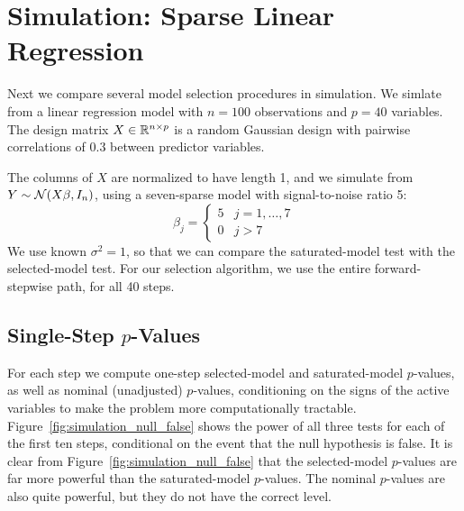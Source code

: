 \documentclass{article}
\begin{document}
\section{Simulation: Sparse Linear Regression}\label{sec:sparseReg}

Next we compare several model selection procedures in simulation. We simlate from a linear regression model with $n=100$ observations and $p=40$ variables. The design matrix $X\in\mathbb{R}^{n\times p}$ is a random Gaussian design with pairwise correlations of 0.3 between predictor variables.

The columns of $X$ are normalized to have length 1, and we simulate from $Y \sim \mathcal{N}(X\beta,I_n)$, using a seven-sparse model with signal-to-noise ratio 5:
\[
\beta_j = \left\{\begin{matrix}5 & j = 1,\ldots,7\\ 0 &
    j>7\end{matrix}\right.
\]
We use known $\sigma^2=1$, so that we can compare the saturated-model test with the selected-model test. For our selection algorithm, we use the entire forward-stepwise path, for all 40 steps. 

\subsection{Single-Step $p$-Values}

For each step we compute one-step selected-model and saturated-model $p$-values, as well as nominal (unadjusted) $p$-values, conditioning on the signs of the active variables to make the problem more computationally tractable. Figure~\ref{fig:simulation_null_false} shows the power of all three tests for each of the first ten steps, conditional on the event that the null hypothesis is false. It is clear from Figure~\ref{fig:simulation_null_false} that the selected-model $p$-values are far more powerful than the saturated-model $p$-values. The nominal $p$-values are also quite powerful, but they do not have the correct level.
\end{document}
